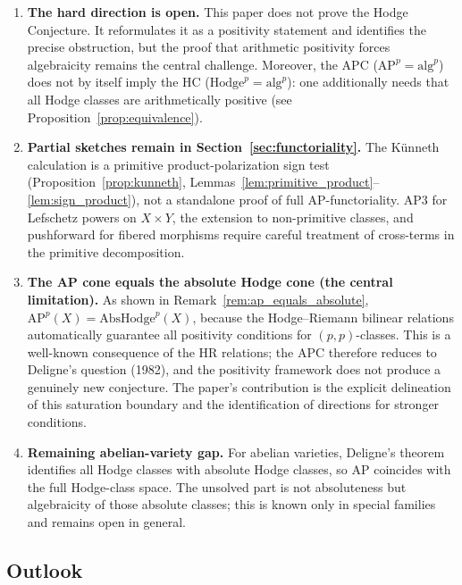 \documentclass[aps,prd,twocolumn,superscriptaddress,nofootinbib]{revtex4-2}
\theoremstyle{definition}
\theoremstyle{remark}
\begin{document}
\begin{enumerate}
\item \textbf{The hard direction is open.} This paper does not prove the Hodge Conjecture. It reformulates it as a positivity statement and identifies the precise obstruction, but the proof that arithmetic positivity forces algebraicity remains the central challenge. Moreover, the APC ($\mathrm{AP}^p = \mathrm{alg}^p$) does not by itself imply the HC ($\mathrm{Hodge}^p = \mathrm{alg}^p$): one additionally needs that all Hodge classes are arithmetically positive (see Proposition~\ref{prop:equivalence}).

\item \textbf{Partial sketches remain in Section~\ref{sec:functoriality}.} The Künneth calculation is a primitive product-polarization sign test (Proposition~\ref{prop:kunneth}, Lemmas~\ref{lem:primitive_product}--\ref{lem:sign_product}), not a standalone proof of full AP-functoriality. AP3 for Lefschetz powers on $X\times Y$, the extension to non-primitive classes, and pushforward for fibered morphisms require careful treatment of cross-terms in the primitive decomposition.

\item \textbf{The AP cone equals the absolute Hodge cone (the central limitation).} As shown in Remark~\ref{rem:ap_equals_absolute}, $\mathrm{AP}^p(X) = \mathrm{AbsHodge}^p(X)$, because the Hodge--Riemann bilinear relations automatically guarantee all positivity conditions for $(p,p)$-classes. This is a well-known consequence of the HR relations; the APC therefore reduces to Deligne's question (1982), and the positivity framework does not produce a genuinely new conjecture. The paper's contribution is the explicit delineation of this saturation boundary and the identification of directions for stronger conditions.

\item \textbf{Remaining abelian-variety gap.} For abelian varieties, Deligne's theorem identifies all Hodge classes with absolute Hodge classes, so AP coincides with the full Hodge-class space. The unsolved part is not absoluteness but algebraicity of those absolute classes; this is known only in special families and remains open in general.
\end{enumerate}

\subsection{Outlook}
\end{document}
